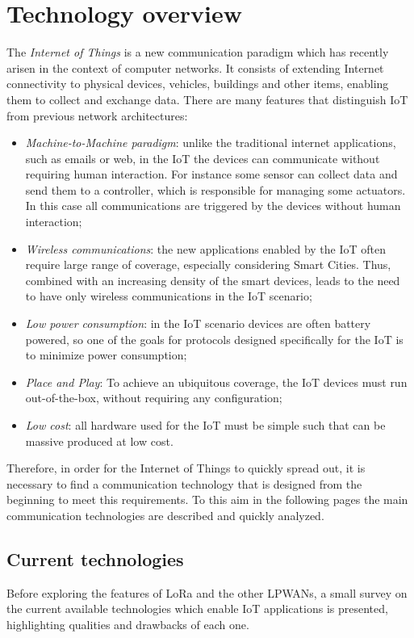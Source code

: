 \chapter{Technology overview}

The \emph{Internet of Things} is a new communication paradigm which has recently arisen in the context of computer networks. It consists of extending Internet connectivity to physical devices, vehicles, buildings and other items, enabling them to collect and exchange data. There are many features that distinguish IoT from previous network architectures:

\begin{itemize}
\item \emph{Machine-to-Machine paradigm}: unlike the traditional internet applications, such as emails or web, in the IoT the devices can communicate without requiring human interaction. For instance some sensor can collect data and send them to a controller, which is responsible for managing some actuators. In this case all communications are triggered by the devices without human interaction;

\item \emph{Wireless communications}: the new applications enabled by the IoT often require large range of coverage, especially considering Smart Cities. Thus, combined with an increasing density of the smart devices, leads to the need to have only wireless communications in the IoT scenario;

\item \emph{Low power consumption}: in the IoT scenario devices are often battery powered, so one of the goals for protocols designed specifically for the IoT is to minimize power consumption;

\item \emph{Place and Play}: To achieve an ubiquitous coverage, the IoT devices must run out-of-the-box, without requiring any configuration;

\item \emph{Low cost}: all hardware used for the IoT must be simple such that can be massive produced at low cost.
\end{itemize}
Therefore, in order for the Internet of Things to quickly spread out, it is necessary to find a communication technology that is designed from the beginning to meet this requirements. To this aim in the following pages the main communication technologies are described and quickly analyzed. 

\section{Current technologies}
Before exploring the features of LoRa and the other LPWANs, a small survey on the current available technologies which enable IoT applications is presented, highlighting qualities and drawbacks of each one.

